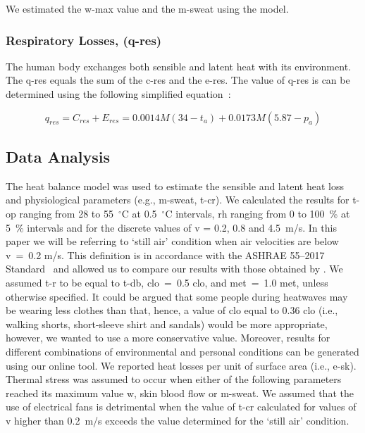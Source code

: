 We estimated the \ac{w-max} value and the \ac{m-sweat} using the  model.

\subsubsection{Respiratory Losses, (\acs{q-res})}
The human body exchanges both sensible and latent heat with its environment.
The \acf{q-res} equals the sum of the \ac{c-res} and the \ac{e-res}.
The value of \ac{q-res} is can be determined using the following simplified equation~\cite{ASHRA2017}:

\begin{equation}
    q_{res} = C_{res} + E_{res} = 0.0014M(34-t_{a}) + 0.0173M(5.87-p_{a})\label{eq:respiratory-losses}
\end{equation}

\subsection{Data Analysis}\label{subsec:data-analysis}

The heat balance model was used to estimate the sensible and latent heat loss and physiological parameters (e.g., \ac{m-sweat}, \ac{t-cr}).
We calculated the results for \ac{t-op} ranging from 28 to 55~$^{\circ}$C at 0.5~$^{\circ}$C intervals, \ac{rh} ranging from 0 to 100~\% at 5~\% intervals and for the discrete values of \ac{v} = 0.2, 0.8 and 4.5~m/s.
In this paper we will be referring to `still air' condition when air velocities are below \ac{v}~=~0.2 m/s.
This definition is in accordance with the ASHRAE 55--2017 Standard~\cite{ashrae552017} and allowed us to compare our results with those obtained by .
We assumed \ac{t-r} to be equal to \ac{t-db}, \ac{clo}~=~0.5 clo, and \ac{met}~=~1.0 met, unless otherwise specified.
It could be argued that some people during heatwaves may be wearing less clothes than that, hence, a value of \ac{clo} equal to 0.36 clo (i.e., walking shorts, short-sleeve shirt and sandals) would be more appropriate, however, we wanted to use a more conservative value.
Moreover, results for different combinations of environmental and personal conditions can be generated using our online tool.
We reported heat losses per unit of surface area (i.e., \ac{e-sk}).
Thermal stress was assumed to occur when either of the following parameters reached its maximum value \ac{w}, skin blood flow or \ac{m-sweat}.
We assumed that the use of electrical fans is detrimental when the value of \ac{t-cr} calculated for values of \ac{v} higher than 0.2~m/s exceeds the value determined for the `still air' condition.


